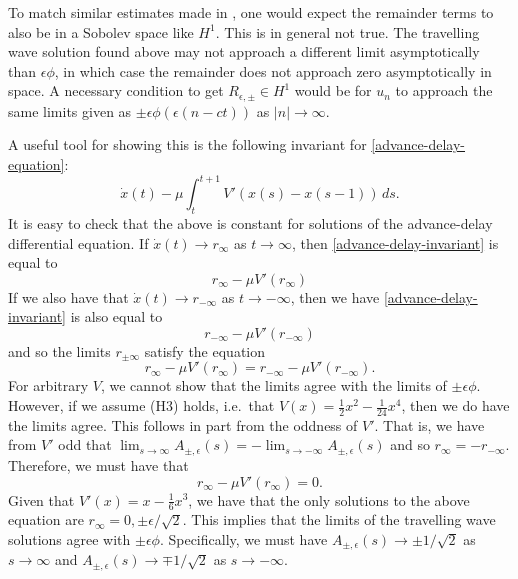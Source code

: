 To match similar estimates made in \cite{friesecke1999solitary}, one would expect the remainder terms to also be in a Sobolev space like \(H^1\). This is in general not true. The travelling wave solution found above may not approach a different limit asymptotically than \(\epsilon \phi \), in which case the remainder does not approach zero asymptotically in space. A necessary condition to get \(R_{\epsilon,\pm}\in H^1\) would be for \(u_n\) to approach the same limits given as \(\pm \epsilon \phi(\epsilon (n-ct))\) as \(|n| \to \infty\).

A useful tool for showing this is the following invariant for \cref{advance-delay-equation}:
\begin{equation}\label{advance-delay-invariant}
	\dot x(t) - \mu \int_t^{t+1} V'(x(s) - x(s-1)) \, ds.
\end{equation}
It is easy to check that the above is constant for solutions of the advance-delay differential equation. If \(\dot x(t) \to r_\infty\) as \(t\to \infty\), then \cref{advance-delay-invariant} is equal to 
\begin{equation}
	r_\infty - \mu V'(r_\infty)
\end{equation}
If we also have that \(\dot x(t) \to r_{-\infty}\) as \(t\to-\infty\), then we have \cref{advance-delay-invariant} is also equal to 
\begin{equation}
	r_{-\infty} - \mu V'(r_{-\infty}) 
\end{equation}
and so the limits \(r_{\pm \infty}\) satisfy the equation
\begin{equation}
	r_\infty - \mu V'(r_\infty) = r_{-\infty} - \mu V'(r_{-\infty}) .
\end{equation}
For arbitrary \(V\), we cannot show that the limits agree with the limits of \(\pm\epsilon \phi \). However, if we assume (H3) holds, i.e.\ that \(V(x) = \frac 1 2 x^2 - \frac 1 {24} x^4\), then we do have the limits agree. This follows in part from the oddness of \(V'\). That is, we have from \(V'\) odd that \(\lim_{s\to\infty} A_{\pm,\epsilon} (s) = -\lim_{s\to-\infty} A_{\pm, \epsilon}(s)\) and so \(r_\infty = - r_{-\infty}\). Therefore, we must have that 
\begin{equation}
	r_\infty - \mu V'(r_\infty) = 0.
\end{equation}
Given that \(V'(x) = x - \frac 1 6 x^3\), we have that the only solutions to the above equation are \(r_{\infty} = 0, \pm \epsilon / \sqrt 2\). This implies that the limits of the travelling wave solutions agree with \(\pm \epsilon \phi\). Specifically, we must have \(A_{\pm, \epsilon}(s) \to \pm 1 / \sqrt 2\) as \(s\to \infty\) and \(A_{\pm, \epsilon}(s) \to \mp 1 / \sqrt 2\) as \(s\to -\infty\).

